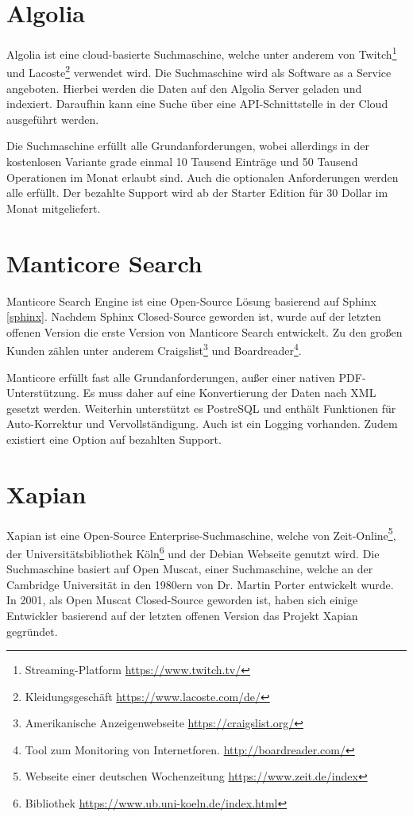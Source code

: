 \section{Algolia}
\label{algolia}

Algolia ist eine cloud-basierte Suchmaschine, welche unter anderem von Twitch\footnote{Streaming-Platform \url{https://www.twitch.tv/}} und Lacoste\footnote{Kleidungsgeschäft \url{https://www.lacoste.com/de/}} verwendet wird. Die Suchmaschine wird als Software as a Service angeboten. Hierbei werden die Daten auf den Algolia Server geladen und indexiert. Daraufhin kann eine Suche über eine API-Schnittstelle in der Cloud ausgeführt werden.

Die Suchmaschine erfüllt alle Grundanforderungen, wobei allerdings in der kostenlosen Variante grade einmal 10 Tausend Einträge und 50 Tausend Operationen im Monat erlaubt sind. Auch die optionalen Anforderungen werden alle erfüllt. Der bezahlte Support wird ab der Starter Edition für 30 Dollar im Monat mitgeliefert. \cite{Algolia.2019}

\section{Manticore Search}
\label{manticore}

Manticore Search Engine ist eine Open-Source Lösung basierend auf Sphinx \ref{sphinx}. Nachdem Sphinx Closed-Source geworden ist, wurde auf der letzten offenen Version die erste Version von Manticore Search entwickelt. Zu den großen Kunden zählen unter anderem Craigslist\footnote{Amerikanische Anzeigenwebseite \url{https://craigslist.org/}} und Boardreader\footnote{Tool zum Monitoring von Internetforen. \url{http://boardreader.com/}}.

Manticore erfüllt fast alle Grundanforderungen, außer einer nativen PDF-Unterstützung. Es muss daher auf eine Konvertierung der Daten nach XML gesetzt werden. Weiterhin unterstützt es PostreSQL und enthält Funktionen für Auto-Korrektur und Vervollständigung. Auch ist ein Logging vorhanden. Zudem existiert eine Option auf bezahlten Support. \cite{ManticoreSoftwareLtd.2019}

\section{Xapian}
\label{xapian}

Xapian ist eine Open-Source Enterprise-Suchmaschine, welche von Zeit-Online\footnote{Webseite einer deutschen Wochenzeitung \url{https://www.zeit.de/index}}, der Universitätsbibliothek Köln\footnote{Bibliothek \url{https://www.ub.uni-koeln.de/index.html}} und der Debian Webseite genutzt wird. Die Suchmaschine basiert auf Open Muscat, einer Suchmaschine, welche an der Cambridge Universität in den 1980ern von Dr. Martin Porter entwickelt wurde. In 2001, als Open Muscat Closed-Source geworden ist, haben sich einige Entwickler basierend auf der letzten offenen Version das Projekt Xapian gegründet.

